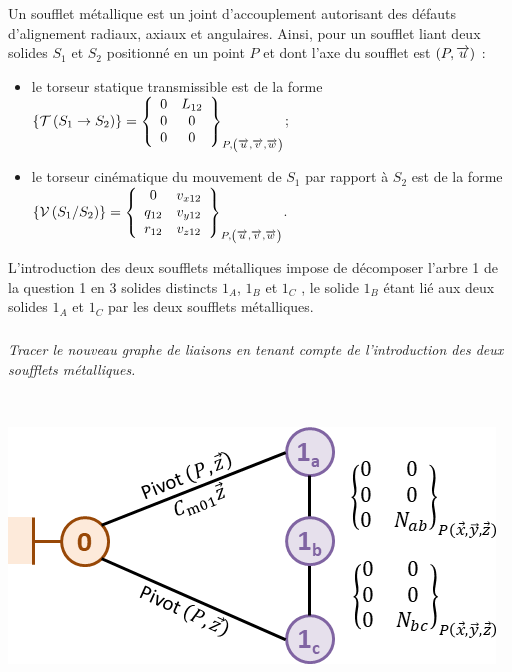 \documentclass[10pt,fleqn]{article} %
\begin{document}
\begin{multicols}{2}
Un soufflet métallique est un joint d’accouplement autorisant des défauts d’alignement radiaux, axiaux et angulaires. Ainsi, pour un soufflet liant deux solides $S_1$ et $S_2$ positionné en un point $P$ et dont l’axe du soufflet est $\axe{P}{u}$ :
\begin{itemize}
\item le torseur statique transmissible est de la forme $\torseurstat{T}{S_1}{S_2}=\torseurcol{0}{0}{0}{L_{12}}{0}{0}{P,\base{u}{v}{w}}$;
\item le torseur cinématique du mouvement de $S_1$ par rapport à $S_2$ est de la forme $\torseurcin{V}{S_1}{S_2}=\torseurcol{0}{q_{12}}{r_{12}}{v_{x12}}{v_{y12}}{v_{z12}}{P,\base{u}{v}{w}}$.
\end{itemize}


L’introduction des deux soufflets métalliques impose de décomposer l’arbre 1 de la question 1 en 3 solides distincts $1_A$, $1_B$ et $1_C$ , le solide $1_B$ étant lié aux deux solides $1_A$ et $1_C$ par les deux soufflets métalliques.

\fi


\subparagraph{}\textit{Tracer le nouveau graphe de liaisons en tenant compte de l’introduction des deux soufflets métalliques.}
\ifprof
\begin{corrige} ~\\

\begin{center}
\includegraphics[width=\linewidth]{images/cor_02}
\end{center}

\end{corrige}
\else
\fi



\end{multicols}
\end{document}
